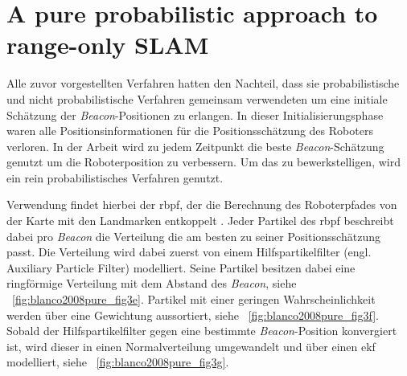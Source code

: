 \begin{comment}
------------------------------------------------------------------------------------------
-\cite{smith2004tracking}
	- Tracking moving devices with the cricket location system (547)
\end{comment}


\begin{comment}
------------------------------------------------------------------------------------------
\end{comment}
\section{A pure probabilistic approach to range-only SLAM}\label{sec:blanco2008pure}

Alle zuvor vorgestellten Verfahren hatten den Nachteil, dass sie probabilistische und nicht probabilistische Verfahren gemeinsam verwendeten um eine initiale Schätzung der \textit{Beacon}-Positionen zu erlangen. In dieser Initialisierungsphase waren alle Positionsinformationen für die Positionsschätzung des Roboters verloren. In der Arbeit  \cite{blanco2008pure} wird zu jedem Zeitpunkt die beste \textit{Beacon}-Schätzung genutzt um die Roboterposition zu verbessern. Um das zu bewerkstelligen, wird ein rein probabilistisches Verfahren genutzt.

Verwendung findet hierbei der \Gls{rbpf}, der die Berechnung des Roboterpfades von der Karte mit den Landmarken entkoppelt \cite{murphy2001rao, montemerlo2002fastslam}. Jeder Partikel des \Gls{rbpf} beschreibt dabei pro \textit{Beacon} die Verteilung die am besten zu seiner Positionsschätzung passt. Die Verteilung wird dabei zuerst von einem Hilfspartikelfilter (engl. Auxiliary Particle Filter) modelliert. Seine Partikel besitzen dabei eine ringförmige Verteilung mit dem Abstand des \textit{Beacon}, siehe \figurename~\ref{fig:blanco2008pure_fig3e}. Partikel mit einer geringen Wahrscheinlichkeit werden über eine Gewichtung aussortiert, siehe \figurename~\ref{fig:blanco2008pure_fig3f}. Sobald der Hilfspartikelfilter gegen eine bestimmte \textit{Beacon}-Position konvergiert ist, wird dieser in einen Normalverteilung umgewandelt und über einen \Gls{ekf} modelliert, siehe \figurename~\ref{fig:blanco2008pure_fig3g}.

